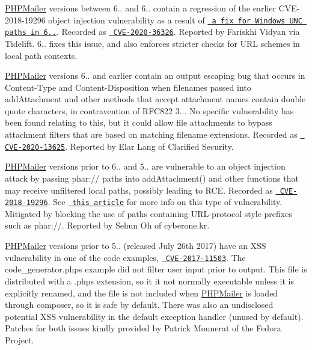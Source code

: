 \mbox{\hyperlink{namespace_p_h_p_mailer}{PHPMailer}} versions between 6.. and 6.. contain a regression of the earlier CVE-\/2018-\/19296 object injection vulnerability as a result of \href{https://github.com/PHPMailer/PHPMailer/commit/e2e07a355ee8ff36aba21d0242c5950c56e4c6f9}{\texttt{ a fix for Windows UNC paths in 6..}}. Recorded as \href{https://web.nvd.nist.gov/view/vuln/detail?vulnId=CVE-2020-36326}{\texttt{ CVE-\/2020-\/36326}}. Reported by Fariskhi Vidyan via Tidelift. 6.. fixes this issue, and also enforces stricter checks for URL schemes in local path contexts.

\mbox{\hyperlink{namespace_p_h_p_mailer}{PHPMailer}} versions 6.. and earlier contain an output escaping bug that occurs in {\ttfamily Content-\/\+Type} and {\ttfamily Content-\/\+Disposition} when filenames passed into {\ttfamily add\+Attachment} and other methods that accept attachment names contain double quote characters, in contravention of RFC822 3... No specific vulnerability has been found relating to this, but it could allow file attachments to bypass attachment filters that are based on matching filename extensions. Recorded as \href{https://web.nvd.nist.gov/view/vuln/detail?vulnId=CVE-2020-13625}{\texttt{ CVE-\/2020-\/13625}}. Reported by Elar Lang of Clarified Security.

\mbox{\hyperlink{namespace_p_h_p_mailer}{PHPMailer}} versions prior to 6.. and 5.. are vulnerable to an object injection attack by passing {\ttfamily phar\+://} paths into {\ttfamily add\+Attachment()} and other functions that may receive unfiltered local paths, possibly leading to RCE. Recorded as \href{https://web.nvd.nist.gov/view/vuln/detail?vulnId=CVE-2018-19296}{\texttt{ CVE-\/2018-\/19296}}. See \href{https://knasmueller.net/5-answers-about-php-phar-exploitation}{\texttt{ this article}} for more info on this type of vulnerability. Mitigated by blocking the use of paths containing URL-\/protocol style prefixes such as {\ttfamily phar\+://}. Reported by Sehun Oh of cyberone.\+kr.

\mbox{\hyperlink{namespace_p_h_p_mailer}{PHPMailer}} versions prior to 5.. (released July 26th 2017) have an XSS vulnerability in one of the code examples, \href{https://web.nvd.nist.gov/view/vuln/detail?vulnId=CVE-2017-11503}{\texttt{ CVE-\/2017-\/11503}}. The {\ttfamily code\+\_\+generator.\+phps} example did not filter user input prior to output. This file is distributed with a {\ttfamily .phps} extension, so it it not normally executable unless it is explicitly renamed, and the file is not included when \mbox{\hyperlink{namespace_p_h_p_mailer}{PHPMailer}} is loaded through composer, so it is safe by default. There was also an undisclosed potential XSS vulnerability in the default exception handler (unused by default). Patches for both issues kindly provided by Patrick Monnerat of the Fedora Project.

